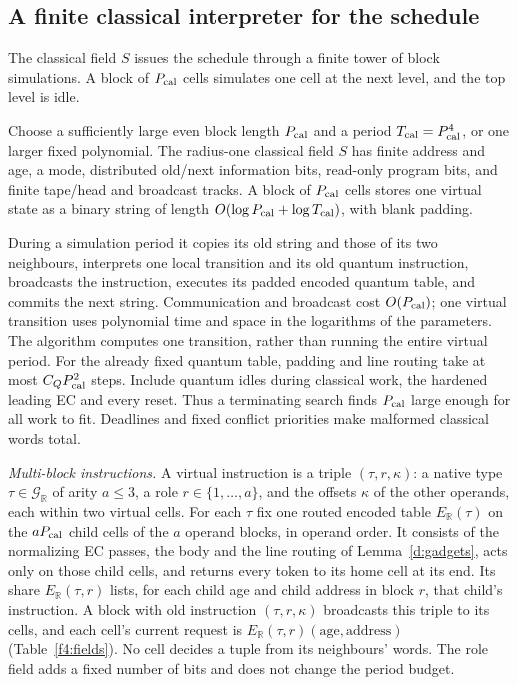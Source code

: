 \subsection{A finite classical interpreter for the schedule}\label{d:calendar-section}
The classical field \(S\) issues the schedule through a finite tower of block simulations. A block of \(P_{\rm cal}\) cells simulates one cell at the next level, and the top level is idle.

Choose a sufficiently large even block length \(P_{\rm cal}\) and a
period \(T_{\rm cal}=P_{\rm cal}^4\), or one larger fixed polynomial.
The radius-one classical field \(S\) has finite address and age,
a mode, distributed old/next information bits, read-only program bits,
and finite tape/head and broadcast tracks. A block of
\(P_{\rm cal}\) cells stores one virtual state as a binary string of
length \(O(\log P_{\rm cal}+\log T_{\rm cal})\), with blank padding.

During a simulation period it copies its old string and those of its
two neighbours, interprets one local transition and its old quantum
instruction, broadcasts the instruction, executes its padded encoded
quantum table, and commits the next string. Communication and broadcast
cost \(O(P_{\rm cal})\); one virtual transition uses polynomial time
and space in the logarithms of the parameters. The algorithm computes
one transition, rather than running the entire virtual period.
For the already fixed quantum table, padding and line routing take
at most \(C_QP_{\rm cal}^2\) steps. Include quantum idles during
classical work, the hardened leading EC and every reset. Thus a
terminating search finds \(P_{\rm cal}\) large enough for all work
to fit. Deadlines and fixed conflict priorities make malformed
classical words total.

\emph{Multi-block instructions.} A virtual instruction is a triple
\((\tau,r,\kappa)\): a native type \(\tau\in\mathcal G_{\mathbb R}\)
of arity \(a\le3\), a role \(r\in\{1,\ldots,a\}\), and the offsets
\(\kappa\) of the other operands, each within two virtual cells. For
each \(\tau\) fix one routed encoded table \(E_{\mathbb R}(\tau)\)
on the \(aP_{\rm cal}\) child cells of the \(a\) operand blocks, in
operand order. It consists of the normalizing EC passes, the body and
the line routing of Lemma~\ref{d:gadgets}, acts only on those child
cells, and returns every token to its home cell at its end. Its share
\(E_{\mathbb R}(\tau,r)\) lists, for each child age and child address
in block \(r\), that child's instruction. A block with old instruction
\((\tau,r,\kappa)\) broadcasts this triple to its cells, and each
cell's current request is
\(E_{\mathbb R}(\tau,r)(\text{age},\text{address})\)
(Table~\ref{f4:fields}). No cell decides a tuple from its
neighbours' words. The role field adds a fixed number of bits and
does not change the period budget.

